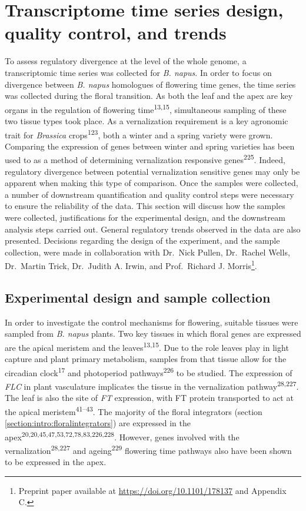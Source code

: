 \documentclass[12pt,]{book}
\begin{document}
\section{Transcriptome time series design, quality control, and
trends}\label{section:spring:developmentaltranscriptome}

To assess regulatory divergence at the level of the whole genome, a
transcriptomic time series was collected for \emph{B. napus}. In order
to focus on divergence between \emph{B. napus} homologues of flowering
time genes, the time series was collected during the floral transition.
As both the leaf and the apex are key organs in the regulation of
flowering time\textsuperscript{13,15}, simultaneous sampling of these
two tissue types took place. As a vernalization requirement is a key
agronomic trait for \emph{Brassica} crops\textsuperscript{123}, both a
winter and a spring variety were grown. Comparing the expression of
genes between winter and spring varieties has been used to as a method
of determining vernalization responsive genes\textsuperscript{225}.
Indeed, regulatory divergence between potential vernalization sensitive
genes may only be apparent when making this type of comparison. Once the
samples were collected, a number of downstream quantification and
quality control steps were necessary to ensure the reliability of the
data. This section will discuss how the samples were collected,
justifications for the experimental design, and the downstream analysis
steps carried out. General regulatory trends observed in the data are
also presented. Decisions regarding the design of the experiment, and
the sample collection, were made in collaboration with Dr.~Nick Pullen,
Dr.~Rachel Wells, Dr.~Martin Trick, Dr.~Judith A. Irwin, and
Prof.~Richard J. Morris\footnote{Preprint paper available at
  \url{https://doi.org/10.1101/178137} and Appendix C.}.

\subsection{Experimental design and sample
collection}\label{section:spring:experimentaldesign}

In order to investigate the control mechanisms for flowering, suitable
tissues were sampled from \emph{B. napus} plants. Two key tissues in
which floral genes are expressed are the apical meristem and the
leaves\textsuperscript{13,15}. Due to the role leaves play in light
capture and plant primary metabolism, samples from that tissue allow for
the circadian clock\textsuperscript{17} and photoperiod
pathways\textsuperscript{226} to be studied. The expression of
\emph{FLC} in plant vasculature implicates the tissue in the
vernalization pathway\textsuperscript{28,227}. The leaf is also the site
of \emph{FT} expression, with FT protein transported to act at the
apical meristem\textsuperscript{41--43}. The majority of the floral
integrators (section \ref{section:intro:floralintegrators}) are
expressed in the apex\textsuperscript{20,20,45,47,53,72,78,83,226,228}.
However, genes involved with the vernalization\textsuperscript{28,227}
and ageing\textsuperscript{229} flowering time pathways also have been
shown to be expressed in the apex.
\end{document}
